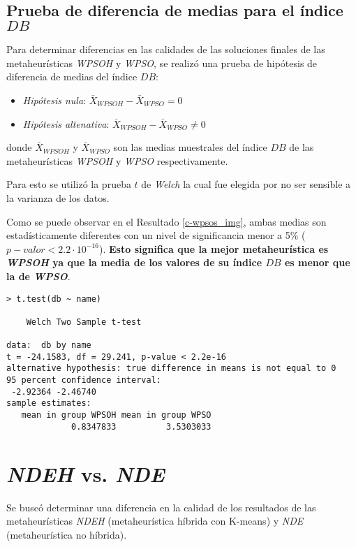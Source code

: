 \subsection{Prueba de diferencia de medias para el índice $DB$}

    Para determinar diferencias en las calidades de las soluciones finales de las
metaheurísticas \emph{WPSOH} y \emph{WPSO}, se realizó una prueba de hipótesis de
diferencia de medias del índice $DB$:
\begin{itemize}
    \item \emph{Hipótesis nula}: $\bar{X}_{WPSOH} - \bar{X}_{WPSO} = 0$
    \item \emph{Hipótesis altenativa}: $\bar{X}_{WPSOH} - \bar{X}_{WPSO} \neq 0$
\end{itemize}
donde $\bar{X}_{WPSOH}$ y $\bar{X}_{WPSO}$ son las medias muestrales del índice
$DB$ de las metaheurísticas \emph{WPSOH} y \emph{WPSO} respectivamente.

    Para esto se utilizó la prueba $t$ de \emph{Welch} \cite{AB_0} la cual fue
elegida por no ser sensible a la varianza de los datos.

	Como se puede observar en el Resultado \ref{c-wpsos_img}, ambas medias son
estadísticamente diferentes con un nivel de significancia menor a 5\%
($p-valor < 2.2 \cdot 10^{-16}$). { \bf Esto significa que la mejor metaheurística
es \emph{WPSOH} ya que la media de los valores de su índice $DB$ es menor que la
de \emph{WPSO}}.

\begin{lstlisting}[float=h!, caption={Diferencia de Medias: Índice \emph{DB}}, label=c-wpsos_img]
> t.test(db ~ name)

	Welch Two Sample t-test

data:  db by name 
t = -24.1583, df = 29.241, p-value < 2.2e-16
alternative hypothesis: true difference in means is not equal to 0 
95 percent confidence interval:
 -2.92364 -2.46740 
sample estimates:
   mean in group WPSOH mean in group WPSO
             0.8347833          3.5303033 

\end{lstlisting}

\section{\emph{NDEH} vs. \emph{NDE}}

	Se buscó determinar una diferencia en la calidad de los resultados de las
metaheurísticas \emph{NDEH} (metaheurística híbrida con K-means) y
\emph{NDE} (metaheurística no híbrida).

